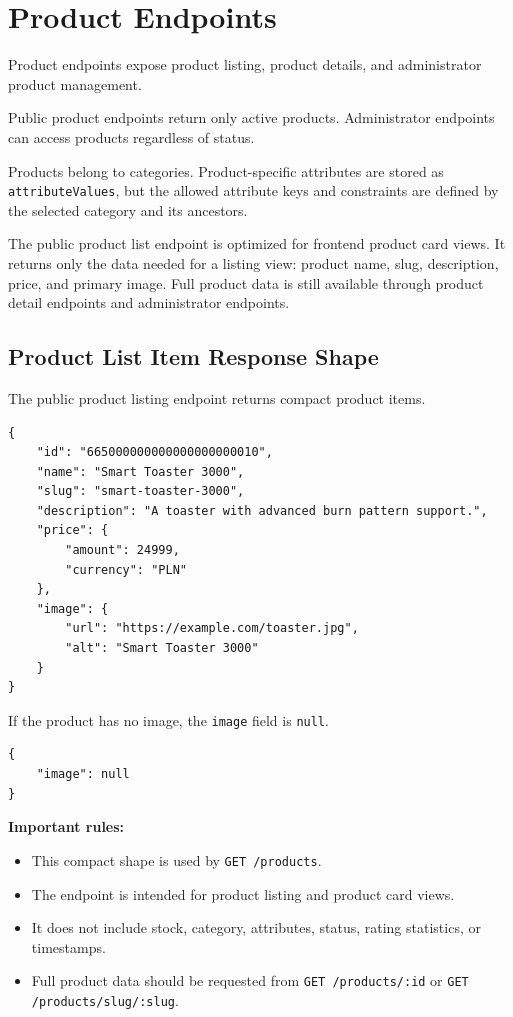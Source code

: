 \section{Product Endpoints}

Product endpoints expose product listing, product details, and administrator product management.

Public product endpoints return only active products. Administrator endpoints can access products regardless of status.

Products belong to categories. Product-specific attributes are stored as \texttt{attributeValues}, but the allowed attribute keys and constraints are defined by the selected category and its ancestors.

The public product list endpoint is optimized for frontend product card views. It returns only the data needed for a listing view: product name, slug, description, price, and primary image. Full product data is still available through product detail endpoints and administrator endpoints.

\subsection{Product List Item Response Shape}

The public product listing endpoint returns compact product items.

\begin{verbatim}
{
    "id": "665000000000000000000010",
    "name": "Smart Toaster 3000",
    "slug": "smart-toaster-3000",
    "description": "A toaster with advanced burn pattern support.",
    "price": {
        "amount": 24999,
        "currency": "PLN"
    },
    "image": {
        "url": "https://example.com/toaster.jpg",
        "alt": "Smart Toaster 3000"
    }
}
\end{verbatim}

If the product has no image, the \texttt{image} field is \texttt{null}.

\begin{verbatim}
{
    "image": null
}
\end{verbatim}

\textbf{Important rules:}

\begin{itemize}
    \item This compact shape is used by \texttt{GET /products}.
    \item The endpoint is intended for product listing and product card views.
    \item It does not include stock, category, attributes, status, rating statistics, or timestamps.
    \item Full product data should be requested from \texttt{GET /products/:id} or \texttt{GET /products/slug/:slug}.
\end{itemize}

